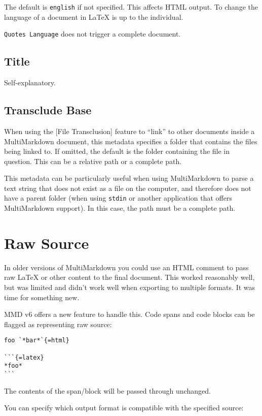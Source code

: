 The default is \texttt{english} if not specified. This affects HTML output. To
change the language of a document in LaTeX is up to the individual.

\texttt{Quotes Language} does not trigger a complete document.

\subsection{Title }
\label{title}

Self-explanatory.

\subsection{Transclude Base }
\label{transcludebase}

When using the {[File Transclusion]} feature to ``link'' to other documents inside a MultiMarkdown document, this metadata specifies a folder that contains the files being linked to. If omitted, the default is the folder containing the file in question. This can be a relative path or a complete path.

This metadata can be particularly useful when using MultiMarkdown to parse a text string that does not exist as a file on the computer, and therefore does not have a parent folder (when using \texttt{stdin} or another application that offers MultiMarkdown support). In this case, the path must be a complete path.

\section{Raw Source }
\label{rawsource}

In older versions of MultiMarkdown you could use an HTML comment to pass raw LaTeX or other content to the final document. This worked reasonably well, but was limited and didn't work well when exporting to multiple formats. It was time for something new.

\gls{MMD} v6 offers a new feature to handle this. Code spans and code blocks can be flagged as representing raw source:

\begin{verbatim}
foo `*bar*`{=html}

```{=latex}
*foo*
```
\end{verbatim}

The contents of the span\slash block will be passed through unchanged.

You can specify which output format is compatible with the specified source:


